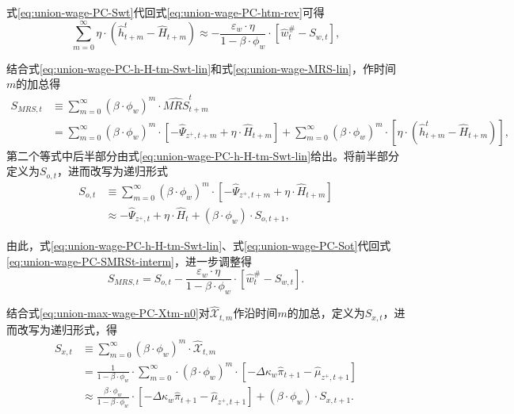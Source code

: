 式\eqref{eq:union-wage-PC-Swt}代回式\eqref{eq:union-wage-PC-htm-rev}可得
\begin{equation}
\label{eq:union-wage-PC-h-H-tm-Swt-lin}
\sum_{m=0}^{\infty} \eta \cdot \left(\hat{h}_{t+m}^t - \hat{H}_{t+m}\right) \approx - \frac{\varepsilon_w \cdot \eta}{1-\beta \cdot \phi_w} \cdot \left[ \hat{w}^{\#}_t -S_{w,t}\right],
\end{equation}

结合式\eqref{eq:union-wage-PC-h-H-tm-Swt-lin}和式\eqref{eq:union-wage-MRS-lin}，作时间$m$的加总得
\begin{equation}
\begin{split}
\label{eq:union-wage-PC-SMRSt-interm}
S_{MRS,t} &\equiv \sum_{m=0}^{\infty} \left(\beta \cdot \phi_w\right)^m \cdot \hat{MRS}^{t}_{t+m} \\
&=\sum_{m=0}^{\infty} \left(\beta \cdot \phi_w\right)^m \cdot \left[-\hat{\Psi}_{z^+,t+m} + \eta \cdot \hat{H}_{t+m} \right] + \sum_{m=0}^{\infty} \left(\beta \cdot \phi_w\right)^m \cdot \left[\eta \cdot \left( \hat{h}^t_{t+m} - \hat{H}_{t+m} \right) \right],
\end{split}
\end{equation}
第二个等式中后半部分由式\eqref{eq:union-wage-PC-h-H-tm-Swt-lin}给出。将前半部分定义为$S_{o,t}$，进而改写为递归形式
\begin{equation}
\begin{split}
\label{eq:union-wage-PC-Sot}
S_{o,t} &\equiv \sum_{m=0}^{\infty} \left(\beta \cdot \phi_w\right)^m \cdot \left[-\hat{\Psi}_{z^+,t+m} + \eta \cdot \hat{H}_{t+m} \right]\\
&\approx - \hat{\Psi}_{z^+,t} + \eta \cdot \hat{H}_t + \left(\beta \cdot \phi_w \right) \cdot S_{o,t+1},
\end{split}
\end{equation}

由此，式\eqref{eq:union-wage-PC-h-H-tm-Swt-lin}、式\eqref{eq:union-wage-PC-Sot}代回式\eqref{eq:union-wage-PC-SMRSt-interm}，进一步调整得
\begin{equation}
\label{eq:union-wage-PC-SMRSt}
S_{MRS,t} = S_{o,t} - \frac{\varepsilon_w \cdot \eta}{1 - \beta \cdot \phi_w} \cdot \left[ \hat{w}^{\#}_t - S_{w,t}\right].
\end{equation}


结合式\eqref{eq:union-max-wage-PC-Xtm-n0}对$\hat{\mathcal{X}}_{t,m}$作沿时间$m$的加总，定义为$S_{x,t}$，进而改写为递归形式，得
\begin{equation}
\label{eq:union-wage-PC-Sxt}
\begin{split}
S_{x,t} &\equiv \sum_{m=0}^{\infty} \left( \beta \cdot \phi_w \right)^m \cdot \hat{\mathcal{X}}_{t,m} \\
&= \frac{1}{1-\beta \cdot \phi_w} \cdot \sum_{m=0}^{\infty} \cdot \left( \beta \cdot \phi_w \right)^m \cdot \left[ - \Delta \kappa_w \hat{\pi}_{t+1} - \hat{\mu}_{z^+,t+1} \right] \\
&\approx \frac{\beta \cdot \phi_w }{1-\beta \cdot \phi_w} \cdot \left[ - \Delta \kappa_w \hat{\pi}_{t+1} - \hat{\mu}_{z^+,t+1} \right] + \left( \beta \cdot \phi_w \right) \cdot S_{x,t+1}.
\end{split}
\end{equation}


